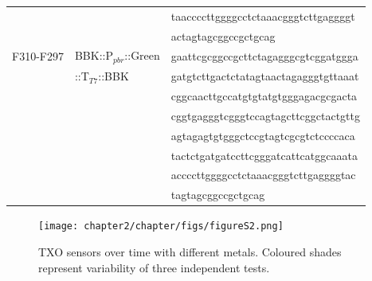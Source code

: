 \begin{table}[ht!]
{\begin{tabular*}{\columnwidth}{@{}lll@{}}
\\
& & \MakeLowercase{TAACCCCTTGGGGCCTCTAAACGGGTCTTGAGGGGt}
\\
& & \MakeLowercase{actagtagcggccgctgcag}
\\
F310-F297 & BBK::P$_{pbr}$::Green & \MakeLowercase{GAATTCGCGGCCGCTTCTAGAGGGCGTCGGATGGGA}
\\
& ::T$_{T7}$::BBK & \MakeLowercase{GATGTCTTGACTCTATAGTAACTAGAGGGTGTTAAAT}
\\
& & \MakeLowercase{CGGCAACTTGCCATGTGTATGTGGGAGACGCGACTA}
\\
& & \MakeLowercase{CGGTGAGGGTCGGGTCCAGTAGCTTCGGCTACTGTTG}
\\
&& \MakeLowercase{AGTAGAGTGTGGGCTCCGTAGTCGCGTCTCCCCACA}
\\
& & \MakeLowercase{TACTCTGATGATCCTTCGGGATCATTCATGGCAAATA}
\\
& & \MakeLowercase{ACCCCTTGGGGCCTCTAAACGGGTCTTGAGGGGtaC}
\\
& & \MakeLowercase{tagtagcggccgctgcag}
\\
\hline
\hline
\end{tabular*}
} { }
\end{table}


\begin{figure} [ht] 
\begin{center}
\texttt{[image: chapter2/chapter/figs/figureS2.png]}
\end{center}
\caption{TXO sensors over time with different metals. Coloured shades represent variability of three independent tests.}
\label{NAR-figS2}%
\end{figure}
